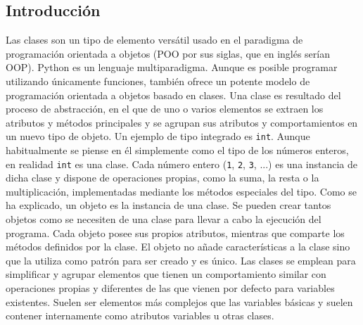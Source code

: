 \documentclass[11pt,a5paper,twoside]{book}
\begin{document}
\subsection{Introducción}
Las clases son un tipo de elemento versátil usado en el paradigma de programación orientada a objetos (POO por sus siglas, que en inglés serían OOP). Python es un lenguaje multiparadigma. Aunque es posible programar utilizando únicamente funciones, también ofrece un potente modelo de programación orientada a objetos basado en clases.
Una clase es resultado del proceso de abstracción, en el que de uno o varios elementos se extraen los atributos y métodos principales y se agrupan sus atributos y comportamientos en un nuevo tipo de objeto. 
Un ejemplo de tipo integrado es {\scriptsize \texttt{int}}. Aunque habitualmente se piense en él simplemente como el tipo de los números enteros, en realidad {\scriptsize \texttt{int}} es una clase. Cada número entero ({\scriptsize \texttt{1}}, {\scriptsize \texttt{2}}, {\scriptsize \texttt{3}}, ...) es una instancia de dicha clase y dispone de operaciones propias, como la suma, la resta o la multiplicación, implementadas mediante los métodos especiales del tipo.
Como se ha explicado, un objeto es la instancia de una clase. Se pueden crear tantos objetos como se necesiten de una clase para llevar a cabo la ejecución del programa. Cada objeto posee sus propios atributos, mientras que comparte los métodos definidos por la clase. El objeto no añade características a la clase sino que la utiliza como patrón para ser creado y es único.
Las clases se emplean para simplificar y agrupar elementos que tienen un comportamiento similar con operaciones propias y diferentes de las que vienen por defecto para variables existentes. Suelen ser elementos más complejos que las variables básicas y suelen contener internamente como atributos variables u otras clases.
\end{document}
